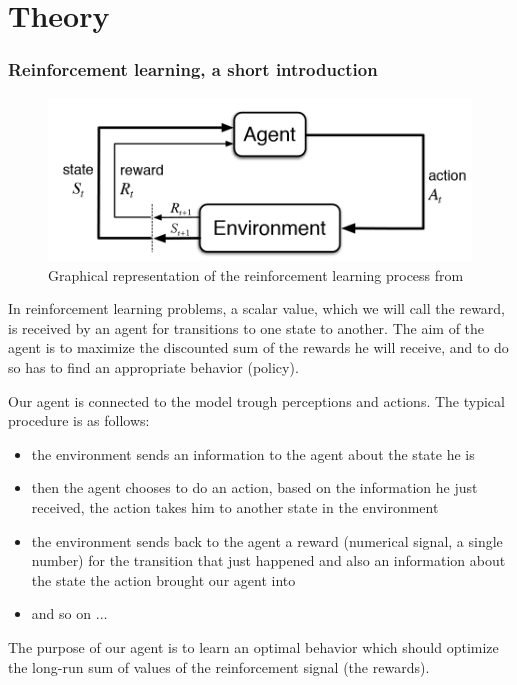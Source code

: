 \documentclass[14pt,a4paper]{article}
\let\oldpart\part
\renewcommand\part{\newpage\oldpart}
\theoremstyle{definition}
\begin{document}
\newpage
\part{Theory} \label{Theory}
\section{Reinforcement learning, a short introduction}

\begin{figure}[H]
\centering
\includegraphics[scale=0.5]{img/RL_graph.png}
\caption{Graphical representation of the reinforcement learning process from \citep{Sutton}}
\label{RL}
\end{figure}

In reinforcement learning problems, a scalar value, which we will call the reward, is received by an agent for transitions to one state to another. The aim of the agent is to maximize the discounted sum of the rewards he will receive, and to do so has to find an appropriate behavior (policy).


Our agent is connected to the model trough perceptions and actions. The typical procedure is as follows: 
\begin{itemize}
\item the environment sends an information to the agent about the state he is
\item then the agent chooses to do an action, based on the information he just received, the action takes him to another state in the environment
\item the environment sends back to the agent a reward (numerical signal, a single number) for the transition that just happened and also an information about the state the action brought our agent into
\item and so on $\ldots$
\end{itemize}

The purpose of our agent is to learn an optimal behavior which should optimize the long-run sum of values of the reinforcement signal (the rewards). \citep{KLMSurvey}
\end{document}

